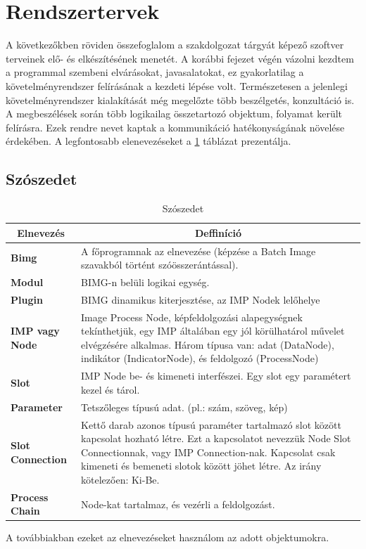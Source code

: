 \documentclass[a4paper,12pt,oneside]{report}
\begin{document}
\section{Rendszertervek}
A következőkben röviden összefoglalom a szakdolgozat tárgyát képező szoftver terveinek elő- és elkészítésének menetét. A korábbi fejezet végén vázolni kezdtem a programmal szembeni elvárásokat, javasalatokat, ez gyakorlatilag a követelményrendszer felírásának a kezdeti lépése volt. Természetesen a jelenlegi követelményrendszer kialakítását még megelőzte több beszélgetés, konzultáció is.\\
A megbeszélések során több logikailag összetartozó objektum, folyamat került felírásra. Ezek rendre nevet kaptak a kommunikáció hatékonyságának növelése érdekében. A legfontosabb elenevezéseket a \ref{table:szoszedet} táblázat prezentálja.

\begin{table}[h]
\subsection{Szószedet}
\begin{tabular}{p{3cm}|p{10cm}}

\toprule
\multicolumn{1}{c}{\textbf{Elnevezés}} & \multicolumn{1}{c}{\textbf{Deffiníció}} \\ \midrule
\textbf{Bimg} & A főprogramnak az elnevezése (képzése a Batch Image szavakból történt szóösszerántással). \\
\hline
\textbf{Modul} & BIMG-n belüli logikai egység. \\
\hline
\textbf{Plugin} & BIMG dinamikus kiterjesztése, az IMP Nodek lelőhelye \\
\hline
\textbf{IMP vagy Node} & Image Process Node, képfeldolgozási alapegységnek tekínthetjük, egy IMP általában egy jól körülhatárol művelet elvégzésére alkalmas. Három típusa van: adat (DataNode), indikátor (IndicatorNode), és feldolgozó (ProcessNode) \\
\hline
\textbf{Slot} & IMP Node be- és kimeneti interfészei. Egy slot egy paramétert kezel és tárol. \\
\hline
\textbf{Parameter} & Tetszőleges típusú adat. (pl.: szám, szöveg, kép) \\
\hline
\textbf{Slot Connection} & Kettő darab azonos típusú paraméter tartalmazó slot között kapcsolat hozható létre. Ezt a kapcsolatot nevezzük Node Slot Connectionnak, vagy IMP Connection-nak. Kapcsolat csak kimeneti és bemeneti slotok között jöhet létre. Az irány kötelezően: Ki-Be. \\
\hline
\textbf{Process Chain} & Node-kat tartalmaz, és vezérli a feldolgozást. \\

\hline
\end{tabular}
\caption{Szószedet}
\label{table:szoszedet}
\end{table}
 A továbbiakban ezeket az elnevezéseket használom az adott objektumokra.
\end{document}
